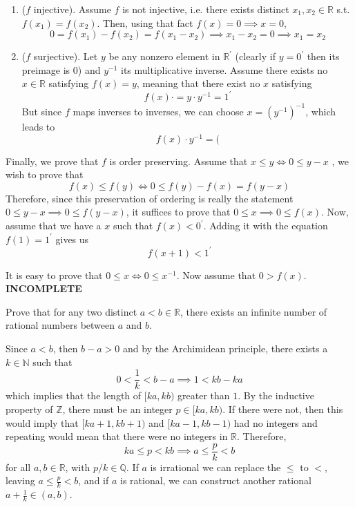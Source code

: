 \documentclass{article}
\begin{document}
\begin{solution}
    \begin{enumerate}
        \item ($f$ injective). Assume $f$ is not injective, i.e. there exists distinct $x_1, x_2 \in \mathbb{R}$ s.t. $f(x_1) = f(x_2)$. Then, using that fact $f(x) = 0 \implies x = 0$, 
        \[0 = f(x_1) - f(x_2) = f(x_1 - x_2) \implies x_1 - x_2 = 0 \implies x_1 = x_2\]
        \item ($f$ surjective). Let $y$ be any nonzero element in $\mathbb{R}^\prime$ (clearly if $y=0^\prime$ then its preimage is $0$) and $y^{-1}$ its multiplicative inverse. Assume there exists no $x \in \mathbb{R}$ satisfying $f(x) = y$, meaning that there exist no $x$ satisfying
        \[f(x) \cdot  = y \cdot y^{-1} = 1^\prime\]
        But since $f$ maps inverses to inverses, we can choose $x = (y^{-1})^{-1}$, which leads to 
        \[f(x) \cdot y^{-1} = (\]
    \end{enumerate}
    Finally, we prove that $f$ is order preserving. Assume that $x \leq y \iff 0 \leq y - x$ , we wish to prove that 
    \[f(x) \leq f(y) \iff 0 \leq f(y) - f(x) = f(y - x)\]
    Therefore, since this preservation of ordering is really the statement $0 \leq y - x \implies 0 \leq f(y - x)$, it suffices to prove that $0 \leq x \implies 0 \leq f(x)$. Now, assume that we have a $x$ such that $f(x) < 0^\prime$. Adding it with the equation $f(1) = 1^\prime$ gives us 
    \[f(x + 1) < 1^\prime\]

    It is easy to prove that $0 \leq x \iff 0 \leq x^{-1}$. Now assume that $0 > f(x)$. \textbf{INCOMPLETE}
    \end{solution}

    \begin{exercise}
    Prove that for any two distinct $a < b \in \mathbb{R}$, there exists an infinite number of rational numbers between $a$ and $b$. 
    \end{exercise}

    \begin{solution}
    Since $a< b$, then $b - a > 0$ and by the Archimidean principle, there exists a $k \in \mathbb{N}$ such that 
    \[0 < \frac{1}{k} < b - a \implies 1 < kb - ka \]
    which implies that the length of $[ka, kb)$ greater than $1$. By the inductive property of $\mathbb{Z}$, there must be an integer $p \in [ka, kb)$. If there were not, then this would imply that $[ka+1, kb+1)$ and $[ka-1, kb-1)$ had no integers and repeating would mean that there were no integers in $\mathbb{R}$. Therefore, 
    \[ka \leq p < kb \implies a \leq \frac{p}{k} < b\]
    for all $a, b \in \mathbb{R}$, with $p/k \in \mathbb{Q}$. If $a$ is irrational we can replace the $\leq$ to $<$, leaving $a \leq \frac{p}{k} < b$, and if $a$ is rational, we can construct another rational $a + \frac{1}{k} \in (a, b)$. 
    \end{solution}
\end{document}
